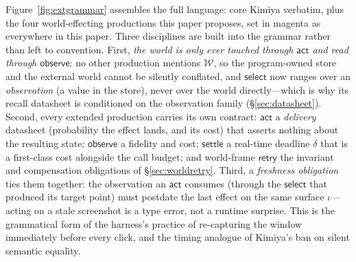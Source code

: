 \documentclass[acmsmall,screen,nonacm]{acmart}
\newcommand{\retry}{\mathsf{retry}}
\newcommand{\select}{\mathsf{select}}
\newcommand{\actc}{\mathsf{act}}
\newcommand{\observe}{\mathsf{observe}}
\newcommand{\settle}{\mathsf{settle}}
\newcommand{\worldstore}{\mathcal{W}}
\theoremstyle{acmdefinition}%
\theoremstyle{acmplain}%
\begin{document}
Figure~\ref{fig:extgrammar} assembles the full language: core Kimiya
verbatim, plus the four world-effecting productions this paper proposes,
set in \textcolor{extcolor}{magenta} as everywhere in this paper. Three
disciplines are built into the grammar rather than left to convention.
First, \emph{the world is only ever touched through $\actc$ and read
through $\observe$}: no other production mentions $\worldstore$, so the
program-owned store and the external world cannot be silently conflated,
and $\select$ now ranges over an \emph{observation} (a value in the
store), never over the world directly---which is why its recall datasheet
is conditioned on the observation family (\S\ref{sec:datasheet}).
Second, every extended production carries its own contract: $\actc$ a
\emph{delivery} datasheet (probability the effect lands, and its cost)
that asserts nothing about the resulting state; $\observe$ a fidelity
and cost; $\settle$ a real-time deadline $\delta$ that is a first-class
cost alongside the call budget; and world-frame $\retry$ the invariant
and compensation obligations of \S\ref{sec:worldretry}. Third, a
\emph{freshness obligation} ties them together: the observation an
$\actc$ consumes (through the $\select$ that produced its target point)
must postdate the last effect on the same surface $\iota$---acting on a
stale screenshot is a type error, not a runtime surprise. This is the
grammatical form of the harness's practice of re-capturing the window
immediately before every click, and the timing analogue of Kimiya's ban
on silent semantic equality.
\end{document}
